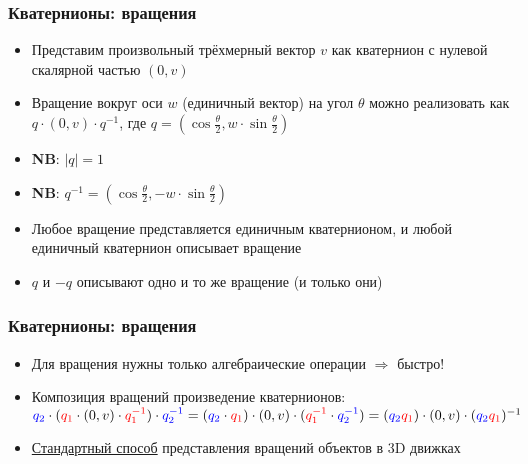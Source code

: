 \documentclass[10pt]{beamer}
\begin{document}
\begin{frame}[fragile]
\frametitle{Кватернионы: вращения}
\begin{itemize}
\item Представим произвольный трёхмерный вектор \begin{math}v\end{math} как кватернион с нулевой скалярной частью \begin{math}(0, v)\end{math}
\pause
\item Вращение вокруг оси \begin{math}w\end{math} (единичный вектор) на угол \begin{math}\theta\end{math} можно реализовать как \begin{math}q \cdot (0, v) \cdot q^{-1}\end{math}, где \begin{math}q = (\cos \frac{\theta}{2}, w \cdot \sin \frac{\theta}{2})\end{math}
\pause
\item \alert{\textbf{NB}}: \begin{math}|q| = 1\end{math}
\item \alert{\textbf{NB}}: \begin{math}q^{-1} = (\cos \frac{\theta}{2}, - w \cdot \sin \frac{\theta}{2})\end{math}
\pause
\item Любое вращение представляется единичным кватернионом, и любой единичный кватернион описывает вращение
\pause
\item \begin{math}q\end{math} и \begin{math}-q\end{math} описывают одно и то же вращение (и только они)
\end{itemize}
\end{frame}

\begin{frame}[fragile]
\frametitle{Кватернионы: вращения}
\begin{itemize}
\item Для вращения нужны только алгебраические операции \begin{math}\Longrightarrow\end{math} быстро!
\pause
\item Композиция вращений \textendash{} произведение кватернионов: \begin{math}{\color{blue}q_2} \cdot ({\color{red}q_1} \cdot (0, v) \cdot {\color{red}q_1^{-1}}) \cdot {\color{blue}q_2^{-1}} = ({\color{blue}q_2} \cdot {\color{red}q_1}) \cdot (0, v) \cdot ({\color{red}q_1^{-1}} \cdot {\color{blue}q_2^{-1}}) = ({\color{blue}q_2}{\color{red}q_1}) \cdot (0, v) \cdot ({\color{blue}q_2}{\color{red}q_1})^{-1}\end{math}
\pause
\item \underline{Стандартный способ} представления вращений объектов в 3D движках
\end{itemize}
\end{frame}
\end{document}
